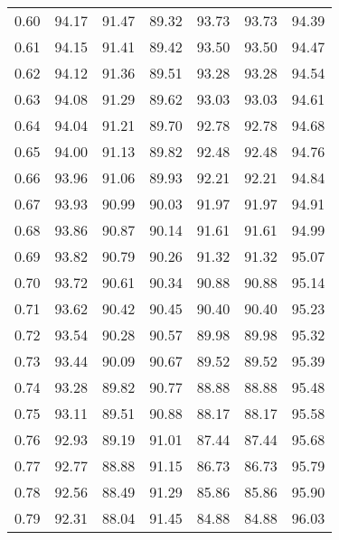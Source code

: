\begin{tabular}{|c|c|c|c|c|c|c|}
      0.60 &     94.17 &     91.47 &      89.32 &   93.73 &      93.73 &         94.39 \\
      0.61 &     94.15 &     91.41 &      89.42 &   93.50 &      93.50 &         94.47 \\
      0.62 &     94.12 &     91.36 &      89.51 &   93.28 &      93.28 &         94.54 \\
      0.63 &     94.08 &     91.29 &      89.62 &   93.03 &      93.03 &         94.61 \\
      0.64 &     94.04 &     91.21 &      89.70 &   92.78 &      92.78 &         94.68 \\
      0.65 &     94.00 &     91.13 &      89.82 &   92.48 &      92.48 &         94.76 \\
      0.66 &     93.96 &     91.06 &      89.93 &   92.21 &      92.21 &         94.84 \\
      0.67 &     93.93 &     90.99 &      90.03 &   91.97 &      91.97 &         94.91 \\
      0.68 &     93.86 &     90.87 &      90.14 &   91.61 &      91.61 &         94.99 \\
      0.69 &     93.82 &     90.79 &      90.26 &   91.32 &      91.32 &         95.07 \\
      0.70 &     93.72 &     90.61 &      90.34 &   90.88 &      90.88 &         95.14 \\
      0.71 &     93.62 &     90.42 &      90.45 &   90.40 &      90.40 &         95.23 \\
      0.72 &     93.54 &     90.28 &      90.57 &   89.98 &      89.98 &         95.32 \\
      0.73 &     93.44 &     90.09 &      90.67 &   89.52 &      89.52 &         95.39 \\
      0.74 &     93.28 &     89.82 &      90.77 &   88.88 &      88.88 &         95.48 \\
      0.75 &     93.11 &     89.51 &      90.88 &   88.17 &      88.17 &         95.58 \\
      0.76 &     92.93 &     89.19 &      91.01 &   87.44 &      87.44 &         95.68 \\
      0.77 &     92.77 &     88.88 &      91.15 &   86.73 &      86.73 &         95.79 \\
      0.78 &     92.56 &     88.49 &      91.29 &   85.86 &      85.86 &         95.90 \\
      0.79 &     92.31 &     88.04 &      91.45 &   84.88 &      84.88 &         96.03 \\

\end{tabular}
